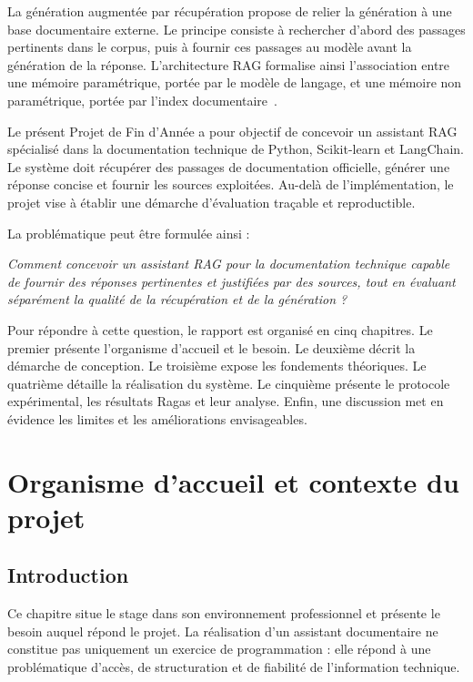 \documentclass[12pt,a4paper,oneside]{report}
\begin{document}
La génération augmentée par récupération propose de relier la génération à une
base documentaire externe. Le principe consiste à rechercher d'abord des
passages pertinents dans le corpus, puis à fournir ces passages au modèle avant
la génération de la réponse. L'architecture RAG formalise ainsi l'association
entre une mémoire paramétrique, portée par le modèle de langage, et une mémoire
non paramétrique, portée par l'index documentaire~\cite{lewis2020rag}.

Le présent Projet de Fin d'Année a pour objectif de concevoir un assistant RAG
spécialisé dans la documentation technique de Python, Scikit-learn et LangChain.
Le système doit récupérer des passages de documentation officielle, générer une
réponse concise et fournir les sources exploitées. Au-delà de l'implémentation,
le projet vise à établir une démarche d'évaluation traçable et reproductible.

La problématique peut être formulée ainsi :

\begin{center}
\begin{minipage}{0.88\linewidth}
\itshape
Comment concevoir un assistant RAG pour la documentation technique capable de
fournir des réponses pertinentes et justifiées par des sources, tout en
évaluant séparément la qualité de la récupération et de la génération ?
\end{minipage}
\end{center}

Pour répondre à cette question, le rapport est organisé en cinq chapitres. Le
premier présente l'organisme d'accueil et le besoin. Le deuxième décrit la
démarche de conception. Le troisième expose les fondements théoriques. Le
quatrième détaille la réalisation du système. Le cinquième présente le protocole
expérimental, les résultats Ragas et leur analyse. Enfin, une discussion met en
évidence les limites et les améliorations envisageables.

\chapter{Organisme d'accueil et contexte du projet}
\label{chap:organisme}

\section{Introduction}

Ce chapitre situe le stage dans son environnement professionnel et présente le
besoin auquel répond le projet. La réalisation d'un assistant documentaire ne
constitue pas uniquement un exercice de programmation : elle répond à une
problématique d'accès, de structuration et de fiabilité de l'information
technique.
\end{document}
